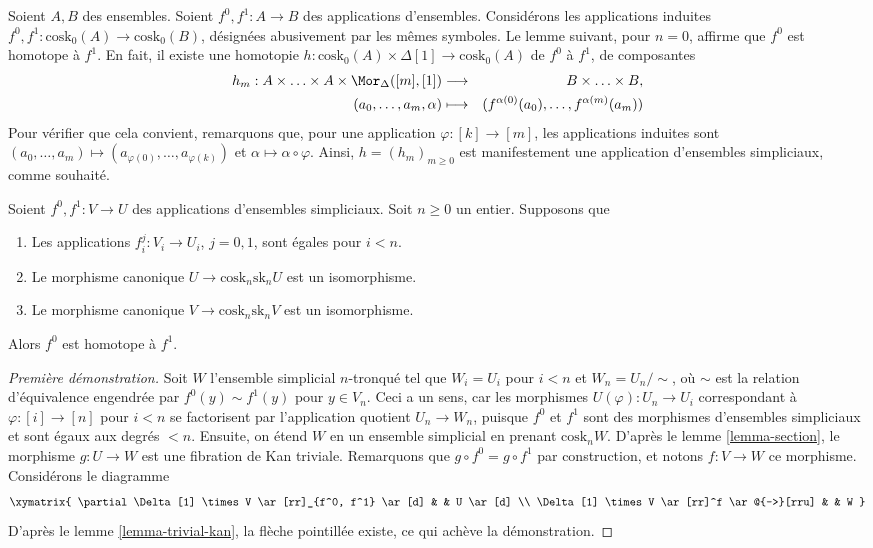 \noindent
Soient $A, B$ des ensembles. Soient $f^0, f^1 : A \to B$ des applications
d'ensembles. Considérons les applications induites
$f^0, f^1 : \text{cosk}_0(A) \to \text{cosk}_0(B)$, désignées abusivement
par les mêmes symboles. Le lemme suivant, pour $n = 0$, affirme que $f^0$
est homotope à $f^1$. En fait, il existe une homotopie
$h : \text{cosk}_0(A) \times \Delta[1] \to \text{cosk}_0(A)$
de $f^0$ à $f^1$, de composantes
\begin{eqnarray*}
h_m : A \times \ldots \times A \times \Mor_{\Delta}([m], [1])
& \longrightarrow &
B \times \ldots \times B, \\
(a_0, \ldots, a_m, \alpha) & \longmapsto &
(f^{\alpha(0)}(a_0), \ldots, f^{\alpha(m)}(a_m))
\end{eqnarray*}
Pour vérifier que cela convient, remarquons que, pour une application
$\varphi : [k] \to [m]$, les applications induites sont
$(a_0, \ldots, a_m) \mapsto (a_{\varphi(0)}, \ldots, a_{\varphi(k)})$
et $\alpha \mapsto \alpha \circ \varphi$. Ainsi, $h = (h_m)_{m \geq 0}$
est manifestement une application d'ensembles simpliciaux, comme souhaité.

\begin{lemma}
\label{lemma-homotopy}
Soient $f^0, f^1 : V \to U$ des applications d'ensembles simpliciaux.
Soit $n \geq 0$ un entier.
Supposons que
\begin{enumerate}
\item Les applications $f^j_i : V_i \to U_i$, $j = 0, 1$, sont égales pour $i < n$.
\item Le morphisme canonique $U \to \text{cosk}_n \text{sk}_n U$
est un isomorphisme.
\item Le morphisme canonique $V \to \text{cosk}_n \text{sk}_n V$
est un isomorphisme.
\end{enumerate}
Alors $f^0$ est homotope à $f^1$.
\end{lemma}

\begin{proof}[Première démonstration]
Soit $W$ l'ensemble simplicial $n$-tronqué tel que $W_i = U_i$ pour
$i < n$ et $W_n = U_n / \sim$, où $\sim$ est la relation d'équivalence
engendrée par $f^0(y) \sim f^1(y)$ pour $y \in V_n$. Ceci a un sens, car les
morphismes $U(\varphi) : U_n \to U_i$ correspondant à
$\varphi : [i] \to [n]$ pour $i < n$ se factorisent par l'application
quotient $U_n \to W_n$, puisque $f^0$ et $f^1$ sont des morphismes
d'ensembles simpliciaux et sont égaux aux degrés $< n$. Ensuite, on étend
$W$ en un ensemble simplicial en prenant $\text{cosk}_n W$. D'après le
lemme \ref{lemma-section}, le morphisme $g : U \to W$ est une fibration de
Kan triviale. Remarquons que $g \circ f^0 = g \circ f^1$ par construction,
et notons $f : V \to W$ ce morphisme. Considérons le diagramme
$$
\xymatrix{
\partial \Delta[1] \times V \ar[rr]_{f^0, f^1} \ar[d] & & U \ar[d] \\
\Delta[1] \times V \ar[rr]^f \ar@{-->}[rru] & & W
}
$$
D'après le lemme \ref{lemma-trivial-kan}, la flèche pointillée existe, ce
qui achève la démonstration.
\end{proof}

